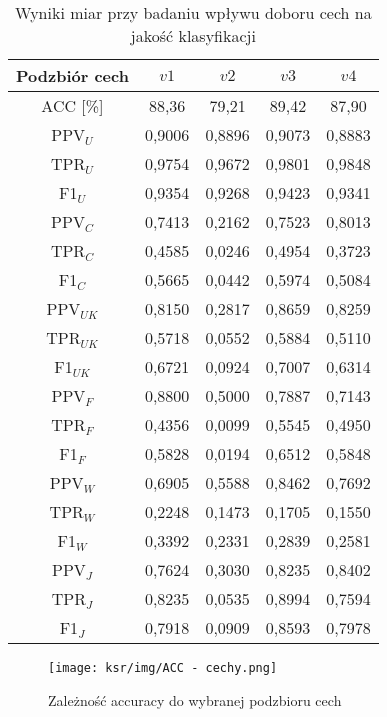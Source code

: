\documentclass{article}
\begin{document}
\begin{table}[H]
    \centering
    \begin{tabular}{|c|c|c|c|c|}
    \hline
    \textbf{Podzbiór cech} & \textbf{\(v1\)} & \textbf{\(v2\)} & \textbf{\(v3\)} & \textbf{\(v4\)}  \\ \hline
    ACC [\%] & 88,36 & 79,21 & 89,42 & 87,90\\ \hline
    PPV\(_U\) & 0,9006& 0,8896 & 0,9073 & 0,8883 \\ \hline
    TPR\(_U\) & 0,9754 & 0,9672 & 0,9801 & 0,9848\\ \hline
    F1\(_U\)  & 0,9354 & 0,9268 & 0,9423 & 0,9341\\ \hline
    PPV\(_C\) & 0,7413 & 0,2162 & 0,7523 & 0,8013\\ \hline
    TPR\(_C\) & 0,4585 & 0,0246 & 0,4954 & 0,3723\\ \hline
    F1\(_C\) & 0,5665 & 0,0442 & 0,5974 & 0,5084\\ \hline
    PPV\(_{UK}\) & 0,8150 & 0,2817 & 0,8659 & 0,8259\\ \hline
    TPR\(_{UK}\) & 0,5718 & 0,0552 & 0,5884 & 0,5110\\ \hline
    F1\(_{UK}\) & 0,6721 & 0,0924 & 0,7007 & 0,6314\\ \hline
    PPV\(_F\) & 0,8800 & 0,5000 & 0,7887 & 0,7143\\ \hline
    TPR\(_F\) & 0,4356 & 0,0099 & 0,5545 & 0,4950\\ \hline
    F1\(_F\) & 0,5828 & 0,0194 & 0,6512 & 0,5848\\ \hline
    PPV\(_W\) & 0,6905 & 0,5588 & 0,8462 & 0,7692\\ \hline
    TPR\(_W\) & 0,2248 & 0,1473 & 0,1705 & 0,1550\\ \hline
    F1\(_W\) & 0,3392 & 0,2331 & 0,2839 & 0,2581\\ \hline
    PPV\(_J\) &0,7624 & 0,3030 & 0,8235 & 0,8402\\ \hline
    TPR\(_J\) & 0,8235 & 0,0535 & 0,8994 & 0,7594\\ \hline
    F1\(_J\) & 0,7918 & 0,0909 & 0,8593 & 0,7978\\ \hline
    \end{tabular}
    \caption{Wyniki miar przy badaniu wpływu doboru cech na jakość klasyfikacji}
\end{table}
\begin{figure}[H]
    \centering
    \texttt{[image: ksr/img/ACC - cechy.png]}
    \caption{Zależność accuracy do wybranej podzbioru cech}
    \label{fig:moj-obraz}
\end{figure}
\end{document}
